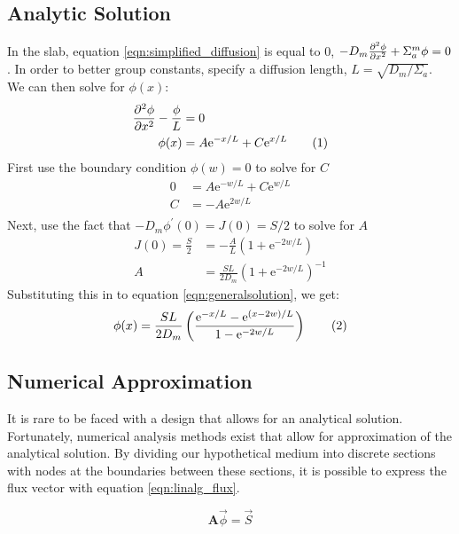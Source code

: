\documentclass[10pt,peerreviewca,onecolumn]{IEEEtran} %
\newcommand{\e}{\mathrm{e}}
\newcommand\numberthis{\addtocounter{equation}{1}\tag{\theequation}}
\newcommand{\opmat}[1]{\mathbf{#1}}
\begin{document}
	\subsection{Analytic Solution}
	In the slab, equation \ref{eqn:simplified_diffusion} is equal to $0$, $-D_m \pdv[2]{\phi}{x} + \Sigma^m_a \phi = 0 $. In order to better group constants, specify a diffusion length, $L = \sqrt{D_m / \Sigma_{a}}$. We can then solve for $\phi(x)$:
	\begin{align*}
		\pdv[2]{\phi}{x} - \frac{\phi}{L} &= 0 \\
		\phi(x) &= A \e^{-x/L} + C \e^{x/L} \numberthis \label{eqn:generalsolution}
	\end{align*}
	First use the boundary condition $\phi(w)=0$ to solve for $C$
	\begin{align*}
		0 &= A \e^{-w/L} + C \e^{w/L} \\
		C &= -A \e^{2w/L} \\
	\end{align*}
	Next, use the fact that $ -D_m \phi^\prime(0) = J(0) = S/2$ to solve for $A$
	\begin{align*}
		J(0) = \frac{S}{2} &= -\frac{A}{L} \left( 1 + \e^{-2w/L} \right) \\
		A &= \frac{S L}{2 D_m}\left( 1 + \e^{-2w/L} \right)^{-1}
	\end{align*}
	Substituting this in to equation \ref{eqn:generalsolution}, we get:
	\begin{equation*}
		\phi(x) = \frac{S L}{2 D_m} \left( \frac{\e^{-x/L} - \e^{\left(x-2w\right)/L}}{1 - \e^{-2w/L}} \right) \numberthis \label{eqn:analyticcartesian}
	\end{equation*}

	\subsection{Numerical Approximation}
	It is rare to be faced with a design that allows for an analytical solution. Fortunately, numerical analysis methods exist that allow for approximation of the analytical solution. By dividing our hypothetical medium into discrete sections with nodes at the boundaries between these sections, it is possible to express the flux vector with equation \ref{eqn:linalg_flux}.

	\begin{equation}
		\opmat{A} \vec{\phi} = \vec{S}
		\label{eqn:linalg_flux}
	\end{equation}
	
\end{document}
